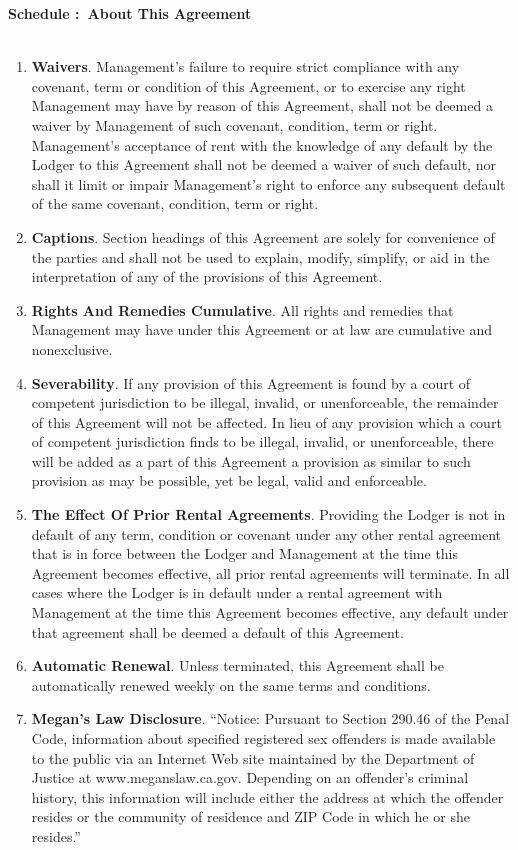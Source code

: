 \documentclass[12pt,letterpaper]{article}
\newcounter{schedulecounter}
\renewcommand{\theschedulecounter}{\Alph{schedulecounter}}
\newenvironment{schedule}[1] {\newpage
	\refstepcounter{schedulecounter}
	\noindent \textbf{\Large Schedule \theschedulecounter:~{#1}}\\ \\
}{}
\newcommand{\meta}{About This Agreement}
\newcommand{\management}{Management}
\begin{document}
\begin{schedule}{\meta{}}
\begin{enumerate}
		This item \ref{modifications} of this section of the Agreement, shall not apply to changes authorized by this Agreement or law.
	\item \textbf{Waivers}. 
		\management{}'s failure to require strict compliance with any covenant, term or condition of this Agreement, or to exercise any right \management{} may have by reason of this Agreement, shall not be deemed a waiver by \management{} of such covenant, condition, term or right. \management{}'s acceptance of rent with the knowledge of any default by the Lodger to this Agreement shall not be deemed a waiver of such default, nor shall it limit or impair \management{}'s right to enforce any subsequent default of the same covenant, condition, term or right. 
	\item \textbf{Captions}. 
		Section headings of this Agreement are solely for convenience of the parties and shall not be used to explain, modify, simplify, or aid in the interpretation of any of the provisions of this Agreement. 
	\item \textbf{Rights And Remedies Cumulative}. 
		All rights and remedies that \management{} may have under this Agreement or at law are cumulative and nonexclusive. 
	\item \textbf{Severability}. 
		If any provision of this Agreement is found by a court of competent jurisdiction to be illegal, invalid, or unenforceable, the remainder of this Agreement will not be affected. In lieu of any provision which a court of competent jurisdiction finds to be illegal, invalid, or unenforceable, there will be added as a part of this Agreement a provision as similar to such provision as may be possible, yet be legal, valid and enforceable. 
	\item \textbf{The Effect Of Prior Rental Agreements}. 
		Providing the Lodger is not in default of any term, condition or covenant under any other rental agreement that is in force between the Lodger and \management{} at the time this Agreement becomes effective, all prior rental agreements will terminate. In all cases where the Lodger is in default under a rental agreement with \management{} at the time this Agreement becomes effective, any default under that agreement shall be deemed a default of this Agreement. 
	\item \textbf{Automatic Renewal}.
		Unless terminated, this Agreement shall be automatically renewed weekly on the same terms and conditions. 
	\item \textbf{Megan's Law Disclosure}.
		``Notice: Pursuant to Section 290.46 of the Penal Code, information about specified registered sex offenders is made available to the public via an Internet Web site maintained by the Department of Justice at www.meganslaw.ca.gov. Depending on an offender's criminal history, this information will include either the address at which the offender resides or the community of residence and ZIP Code in which he or she resides.''
\end{enumerate}
\end{schedule}
\end{document}
